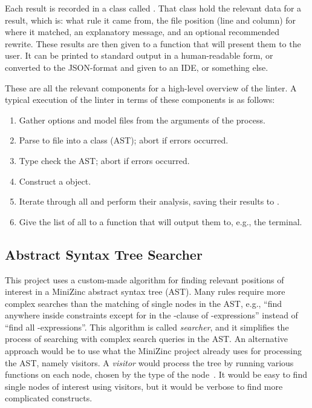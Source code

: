 \documentclass[a4paper,12pt]{article}
\begin{document}
Each result is recorded in a class called . That class hold the relevant data
for a result, which is: what rule it came from, the file position (line and column) for where it
matched, an explanatory message, and an optional recommended rewrite. These results are
then given to a function that will present them to the user. It can be
printed to standard output in a human-readable form, or converted to the JSON-format and
given to an IDE, or something else.

These are all the relevant components for a high-level overview of the linter. A
typical execution of the linter in terms of these components is as follows:
\begin{enumerate}
  \item Gather options and model files from the arguments of the process.
  \item Parse to file into a  class (AST); abort if errors occurred.
  \item Type check the AST; abort if errors occurred.
  \item Construct a  object.
  \item Iterate through all  and perform their analysis, saving their
  results to .
  \item Give the list of all  to a function that will output them to, e.g.,
  the terminal.
\end{enumerate}

\subsection{Abstract Syntax Tree Searcher}\label{sec:searcher}
This project uses a custom-made algorithm for finding relevant positions of interest in a
MiniZinc abstract syntax tree (AST). Many rules require more complex searches than the
matching of single nodes in the AST, e.g., ``find  anywhere inside constraints
except for in the -clause of -expressions'' instead of ``find all -expressions''.
This algorithm is called \emph{searcher}, and it simplifies the process of searching with complex search queries in the AST.
An alternative
approach would be to use what the MiniZinc project already uses for processing the
AST, namely visitors. A \emph{visitor} would process the tree by running various functions on each
node, chosen by the type of the node~\cite[p.~331]{DesignPatterns94}. It would be easy to find
single nodes of interest using visitors, but it would be verbose to find
more complicated constructs. 
\end{document}
